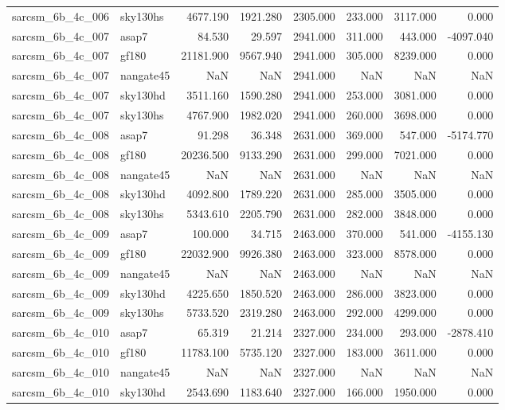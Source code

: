 \begin{tabular}{llrrrrrr}
sarcsm\_6b\_4c\_006 & sky130hs & 4677.190 & 1921.280 & 2305.000 & 233.000 & 3117.000 & 0.000 \\
sarcsm\_6b\_4c\_007 & asap7 & 84.530 & 29.597 & 2941.000 & 311.000 & 443.000 & -4097.040 \\
sarcsm\_6b\_4c\_007 & gf180 & 21181.900 & 9567.940 & 2941.000 & 305.000 & 8239.000 & 0.000 \\
sarcsm\_6b\_4c\_007 & nangate45 & NaN & NaN & 2941.000 & NaN & NaN & NaN \\
sarcsm\_6b\_4c\_007 & sky130hd & 3511.160 & 1590.280 & 2941.000 & 253.000 & 3081.000 & 0.000 \\
sarcsm\_6b\_4c\_007 & sky130hs & 4767.900 & 1982.020 & 2941.000 & 260.000 & 3698.000 & 0.000 \\
sarcsm\_6b\_4c\_008 & asap7 & 91.298 & 36.348 & 2631.000 & 369.000 & 547.000 & -5174.770 \\
sarcsm\_6b\_4c\_008 & gf180 & 20236.500 & 9133.290 & 2631.000 & 299.000 & 7021.000 & 0.000 \\
sarcsm\_6b\_4c\_008 & nangate45 & NaN & NaN & 2631.000 & NaN & NaN & NaN \\
sarcsm\_6b\_4c\_008 & sky130hd & 4092.800 & 1789.220 & 2631.000 & 285.000 & 3505.000 & 0.000 \\
sarcsm\_6b\_4c\_008 & sky130hs & 5343.610 & 2205.790 & 2631.000 & 282.000 & 3848.000 & 0.000 \\
sarcsm\_6b\_4c\_009 & asap7 & 100.000 & 34.715 & 2463.000 & 370.000 & 541.000 & -4155.130 \\
sarcsm\_6b\_4c\_009 & gf180 & 22032.900 & 9926.380 & 2463.000 & 323.000 & 8578.000 & 0.000 \\
sarcsm\_6b\_4c\_009 & nangate45 & NaN & NaN & 2463.000 & NaN & NaN & NaN \\
sarcsm\_6b\_4c\_009 & sky130hd & 4225.650 & 1850.520 & 2463.000 & 286.000 & 3823.000 & 0.000 \\
sarcsm\_6b\_4c\_009 & sky130hs & 5733.520 & 2319.280 & 2463.000 & 292.000 & 4299.000 & 0.000 \\
sarcsm\_6b\_4c\_010 & asap7 & 65.319 & 21.214 & 2327.000 & 234.000 & 293.000 & -2878.410 \\
sarcsm\_6b\_4c\_010 & gf180 & 11783.100 & 5735.120 & 2327.000 & 183.000 & 3611.000 & 0.000 \\
sarcsm\_6b\_4c\_010 & nangate45 & NaN & NaN & 2327.000 & NaN & NaN & NaN \\
sarcsm\_6b\_4c\_010 & sky130hd & 2543.690 & 1183.640 & 2327.000 & 166.000 & 1950.000 & 0.000 \\

\end{tabular}
